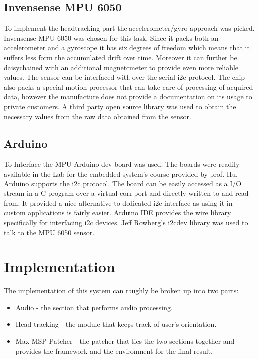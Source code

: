 \documentclass[a4paper,12pt,oneside]{article}
\begin{document}
\subsection{Invensense MPU 6050}

To implement the headtracking part the accelerometer/gyro approach was picked. Invensense MPU 6050 was chosen for this task. Since it packs both an accelerometer and a gyroscope it has six degrees of freedom which means that it suffers less form the accumulated drift over time. Moreover it can further be daisychained with an additional magnetometer to provide even more reliable values. The sensor can be interfaced with over the serial i2c protocol. The chip also packs a special motion processor that can take care of processing of acquired data, however the manufacture does not provide a documentation on its usage to private customers. A third party open source library\cite{i2c} was used to obtain the necessary values from the raw data obtained from the sensor.\cite{mpu1} 

\subsection{Arduino} 

To Interface the MPU Arduino dev board was used. The boards were readily available in the Lab for the embedded system's course provided by prof. Hu. Arduino supports the i2c protocol. The board can be easily accessed as a I/O stream in a C program over a virtual com port and directly written to and read from. It provided a nice alternative to dedicated i2c interface as using it in custom applications is fairly easier. Arduino IDE provides the wire \cite{wire} library specifically for interfacing i2c devices. Jeff Rowberg's i2cdev library\cite{i2c} was used to talk to the MPU 6050 sensor. \cite{ard}

\section{Implementation}

The implementation of this system can roughly be broken up into two parts:
\begin{itemize}
\item Audio - the section that performs audio processing.
\item Head-tracking - the module that keeps track of user's orientation.
\item Max MSP Patcher - the patcher that ties the two sections together and provides the framework and the environment for the final result.

\end{itemize}
\end{document}
